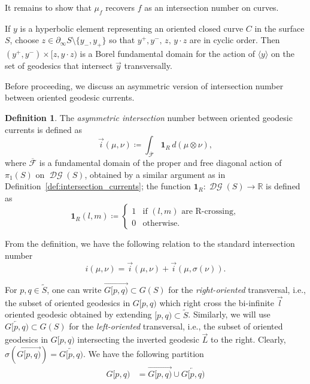 \documentclass[11pt]{amsart}
\newcommand{\ora}[1]{\overrightarrow{#1}}
\newcommand{\ole}[1]{\overleftarrow{#1}}
\numberwithin{equation}{section}
\numberwithin{figure}{section}
\theoremstyle{definition}
\newtheorem{definition}[theorem]{Definition}
\theoremstyle{plain}
\DeclareMathOperator{\DG}{\mathcal{D}\mathcal{G}}
\newcommand*{\wt}[1]{\widetilde{#1}}
\begin{document}
It remains to show that $\mu_f$ recovers $f$ as an intersection number on curves.

If $y$ is a hyperbolic element representing an oriented closed curve
$C$ in the surface $S$, choose
$z \in \partial_{\infty} S \setminus \{ y_-, y_+\}$ so that
$y^+,y^-,\, z,\, y \cdot z$ are in cyclic order.
Then
$(y^+,y^-) \times [z,y \cdot z)$ is a Borel fundamental domain for the
  action of $\langle y \rangle$ on the set of geodesics that intersect
  $\ora{y}$ transversally.

Before proceeding, we discuss an asymmetric version of intersection number between oriented geodesic currents.

\begin{definition} The \emph{asymmetric intersection} number between oriented geodesic currents is defined as 
\begin{equation}
\vec{i}(\mu,\nu) \coloneqq \int_{\overline{\mathcal{F}}} \mathbf{1}_R \, d(\mu \otimes \nu),
\label{eq:asymmetric}
\end{equation}
where $\overline{\mathcal{F}}$ is a fundamental domain of the proper and free diagonal action of $\pi_1(S)$ on $\DG(S)$, obtained by a similar argument as in Definition~\ref{def:intersection_currents};
the function $\mathbf{1}_R \colon \DG(S) \to \mathbb{R}$ is defined as
\[
\mathbf{1}_R(l,m) \coloneqq
\begin{cases}
1 & \text{if } (l,m)\text{ are R-crossing},\\
0 & \text{otherwise}.
\end{cases}
\]
\label{def:asymmetric}
\end{definition}
From the definition, we have the following relation to the standard intersection number
\begin{equation}
i(\mu, \nu) = \vec{i}(\mu, \nu) + \vec{i}(\mu, \sigma(\nu)).
\label{eq:relation_intersections}
\end{equation}

For $p,q \in \wt{S}$, one can write  $\ora{G[p,q)}\subset G(S)$ for the \emph{right-oriented} transversal, i.e., the subset of
oriented geodesics in $G[p,q)$ which right cross the bi-infinite $\ora{l}$ oriented geodesic obtained by extending $[p,q) \subset \wt{S}$. Similarly, we will use $\ole{G[p,q)}\subset G(S)$ for the \emph{left-oriented} transversal, i.e., the subset of
oriented geodesics in $G[p,q)$ intersecting the inverted geodesic $\ora{L}$ to the right. Clearly, $\sigma(\ora{G[p,q)})= \ole{G[p,q)}$.
We have the following partition
\begin{equation}\label{eq:partition_oriented}
\begin{aligned}
G[p,q) &= \ora{G[p,q)} \cup \ole{G[p,q)} 
\end{aligned}
\end{equation}
\end{document}
